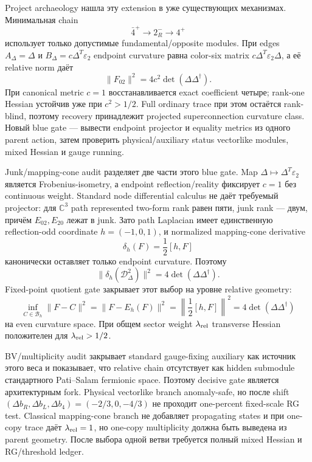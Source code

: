 Project archaeology нашла эту extension в уже существующих механизмах.
Минимальная chain
\begin{equation}
 \bar4^+\longrightarrow2_R^-\longrightarrow4^+
\end{equation}
использует только допустимые fundamental/opposite modules. При edges
\(A_\Delta=\Delta\) и
\(B_\Delta=c\Delta^T\varepsilon_2\) endpoint curvature равна color-six
matrix \(c\Delta^T\varepsilon_2\Delta\), а её relative norm даёт
\begin{equation}
 \|F_{02}\|^2=4c^2\det(\Delta\Delta^\dagger).
\end{equation}
При canonical metric \(c=1\) восстанавливается exact coefficient четыре;
rank-one Hessian устойчив уже при \(c^2>1/2\). Full ordinary trace при этом
остаётся rank-blind, поэтому recovery принадлежит projected superconnection
curvature class. Новый blue gate --- вывести endpoint projector и equality
metrics из одного parent action, затем проверить physical/auxiliary status
vectorlike modules, mixed Hessian и gauge running.

Junk/mapping-cone audit разделяет две части этого blue gate. Map
\(\Delta\mapsto\Delta^T\varepsilon_2\) является Frobenius-isometry, а
endpoint reflection/reality фиксирует \(c=1\) без continuous weight.
Standard node differential calculus не даёт требуемый projector: для
\(\mathbb C^3\) path represented two-form rank равен пяти, junk rank ---
двум, причём \(E_{02},E_{20}\) лежат в junk. Зато path Laplacian имеет
единственную reflection-odd coordinate \(h=(-1,0,1)\), и normalized
mapping-cone derivative
\begin{equation}
 \delta_h(F)=\frac12[h,F]
\end{equation}
канонически оставляет только endpoint curvature. Поэтому
\begin{equation}
 \|\delta_h(\mathcal D_\Delta^2)\|^2
 =4\det(\Delta\Delta^\dagger).
\end{equation}
Fixed-point quotient gate закрывает этот выбор на уровне relative geometry:
\begin{equation}
 \inf_{C\in\mathcal B_h}\|F-C\|^2
 =\|F-E_h(F)\|^2
 =\left\|\frac12[h,F]\right\|^2
 =4\det(\Delta\Delta^\dagger)
\end{equation}
на even curvature space. При общем sector weight
\(\lambda_{\rm rel}\) transverse Hessian положителен для
\(\lambda_{\rm rel}>1/2\).

BV/multiplicity audit закрывает standard gauge-fixing auxiliary как источник
этого веса и показывает, что relative chain отсутствует как hidden submodule
стандартного Pati--Salam fermionic space. Поэтому decisive gate является
архитектурным fork. Physical vectorlike branch anomaly-safe, но после shift
\((\Delta b_R,\Delta b_L,\Delta b_4)=(-2/3,0,-4/3)\) не проходит
one-percent fixed-scale RG test. Classical mapping-cone branch не добавляет
propagating states и при one-copy trace даёт \(\lambda_{\rm rel}=1\), но
one-copy multiplicity должна быть выведена из parent geometry. После выбора
одной ветви требуется полный mixed Hessian и RG/threshold ledger.

